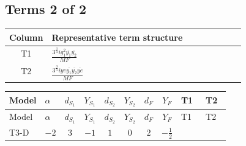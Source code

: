 \documentclass[8pt]{article}
\begin{document}
\begin{landscape}
\subsection*{Terms 2 of 2}
\begin{center}
\begin{tabular}{@{}c >{\raggedright\arraybackslash}p{0.82\linewidth}@{}}
\toprule
Column & Representative term structure \\
\midrule
T1 & \(\displaystyle \frac{3^{\frac{3}{4}} i g_{1}^{2} \overline{y_{1}} \overline{y_{2}}}{MF}\) \\
\midrule
T2 & \(\displaystyle \frac{3^{\frac{3}{4}} i ye \overline{y_{1}} \overline{y_{2}} \overline{ye}}{MF}\) \\
\midrule
\bottomrule
\end{tabular}
\end{center}
\smallskip
\tiny
\begin{longtable}{@{}llcccccc >{\raggedright\arraybackslash}p{0.21\linewidth} >{\raggedright\arraybackslash}p{0.21\linewidth}@{}}
\toprule
Model & $\alpha$ & $d_{S_1}$ & $Y_{S_1}$ & $d_{S_2}$ & $Y_{S_2}$ & $d_F$ & $Y_F$ & T1 & T2 \\
\midrule
\endfirsthead
\toprule
Model & $\alpha$ & $d_{S_1}$ & $Y_{S_1}$ & $d_{S_2}$ & $Y_{S_2}$ & $d_F$ & $Y_F$ & T1 & T2 \\
\midrule
\endhead
T3-D & $-2$ & $3$ & $-1$ & $1$ & $0$ & $2$ & $-\frac{1}{2}$ & \scriptsize\adjustbox{max width=\linewidth}{$\begin{gathered} - \frac{3^{\frac{3}{4}} i g_{1}^{2} \overline{y_{1}} \overline{y_{2}}}{8 MF}\end{gathered}$} & \scriptsize\adjustbox{max width=\linewidth}{$\begin{gathered} \frac{3^{\frac{3}{4}} i ye \overline{y_{1}} \overline{y_{2}} \overline{ye}}{12 MF}\end{gathered}$} \\
\midrule
\bottomrule
\end{longtable}
\end{landscape}
\end{document}
